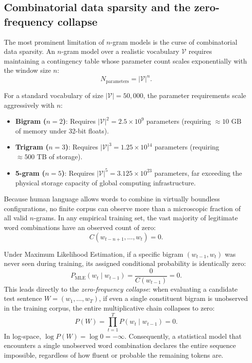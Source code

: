 \documentclass[../../../main.tex]{subfiles}
\begin{document}
\subsection{Combinatorial data sparsity and the zero-frequency collapse}
\label{subsec:data_sparsity_zero_freq}

The most prominent limitation of $n$-gram models is the curse of combinatorial data sparsity. An $n$-gram model over a realistic vocabulary $\mathcal{V}$ requires maintaining a contingency table whose parameter count scales exponentially with the window size $n$:
\begin{equation}
N_{\text{parameters}} = |\mathcal{V}|^n.
\label{eq:ngram_parameter_explosion}
\end{equation}

For a standard vocabulary of size $|\mathcal{V}| = 50{,}000$, the parameter requirements scale aggressively with $n$:
\begin{itemize}
    \item \textbf{Bigram ($n=2$)}: Requires $|\mathcal{V}|^2 = 2.5 \times 10^9$ parameters (requiring $\approx 10\text{ GB}$ of memory under 32-bit floats).
    \item \textbf{Trigram ($n=3$)}: Requires $|\mathcal{V}|^3 = 1.25 \times 10^{14}$ parameters (requiring $\approx 500\text{ TB}$ of storage).
    \item \textbf{5-gram ($n=5$)}: Requires $|\mathcal{V}|^5 = 3.125 \times 10^{23}$ parameters, far exceeding the physical storage capacity of global computing infrastructure.
\end{itemize}

Because human language allows words to combine in virtually boundless configurations, no finite corpus can observe more than a microscopic fraction of all valid $n$-grams. In any empirical training set, the vast majority of legitimate word combinations have an observed count of zero:
\begin{equation}
C\left(w_{t-n+1}, \dots, w_t\right) = 0.
\end{equation}

Under Maximum Likelihood Estimation, if a specific bigram $(w_{t-1}, w_t)$ was never seen during training, its assigned conditional probability is identically zero:
\begin{equation}
P_{\text{MLE}}\left(w_t \mid w_{t-1}\right) = \frac{0}{C\left(w_{t-1}\right)} = 0.
\end{equation}
This leads directly to the \textit{zero-frequency collapse}: when evaluating a candidate test sentence $W = (w_1, \dots, w_T)$, if even a single constituent bigram is unobserved in the training corpus, the entire multiplicative chain collapses to zero:
\begin{equation}
P(W) = \prod_{t=1}^T P\left(w_t \mid w_{t-1}\right) = 0.
\end{equation}
In log-space, $\log P(W) = \log 0 = -\infty$. Consequently, a statistical model that encounters a single unobserved word combination declares the entire sequence impossible, regardless of how fluent or probable the remaining tokens are.
\end{document}
